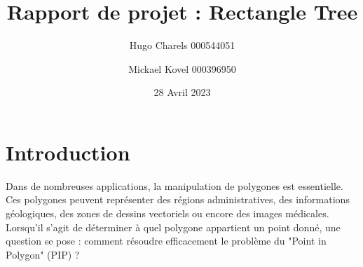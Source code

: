 \documentclass {article}
\begin{document}
\begin{figure}[t]
	\label{fig:logo}
\end{figure}
\author {Hugo Charels 000544051 \and Mickael Kovel 000396950}
\date {28 Avril 2023}
\title {Rapport de projet : Rectangle Tree}

\maketitle
\newpage


\tableofcontents
\newpage
\section {Introduction}

Dans de nombreuses applications, la manipulation de polygones est essentielle. Ces polygones peuvent représenter
des régions administratives, des informations géologiques, des zones de dessins vectoriels ou encore des
images médicales. Lorsqu'il s'agit de déterminer à quel polygone appartient un point donné, une question se pose :
comment résoudre efficacement le problème du "Point in Polygon" (PIP) ?
\end{document}
